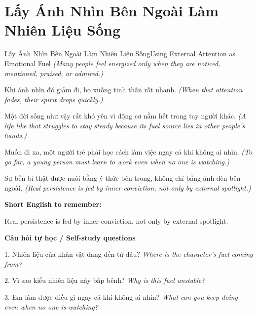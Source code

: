 \section{Lấy Ánh Nhìn Bên Ngoài Làm Nhiên Liệu Sống}
\begin{truyen}{Lấy Ánh Nhìn Bên Ngoài Làm Nhiên Liệu Sống}{Using External Attention as Emotional Fuel}
\textit{(Many people feel energized only when they are noticed, mentioned, praised, or admired.)}

Khi ánh nhìn đó giảm đi, họ xuống tinh thần rất nhanh.
\textit{(When that attention fades, their spirit drops quickly.)}

Một đời sống như vậy rất khó yên vì động cơ nằm hết trong tay người khác.
\textit{(A life like that struggles to stay steady because its fuel source lies in other people’s hands.)}

Muốn đi xa, một người trẻ phải học cách làm việc ngay cả khi không ai nhìn.
\textit{(To go far, a young person must learn to work even when no one is watching.)}

\end{truyen}

\begin{baihoc}
Sự bền bỉ thật được nuôi bằng ý thức bên trong, không chỉ bằng ánh đèn bên ngoài.
\textit{(Real persistence is fed by inner conviction, not only by external spotlight.)}
\end{baihoc}

\begin{ghinhoanh}
\textbf{Short English to remember:}

Real persistence is fed by inner conviction, not only by external spotlight.

\end{ghinhoanh}

\begin{tuhocnhanh}
\textbf{Câu hỏi tự học / Self-study questions}

1. Nhiên liệu của nhân vật đang đến từ đâu? \textit{Where is the character’s fuel coming from?}

2. Vì sao kiểu nhiên liệu này bấp bênh? \textit{Why is this fuel unstable?}

3. Em làm được điều gì ngay cả khi không ai nhìn? \textit{What can you keep doing even when no one is watching?}
\end{tuhocnhanh}
\ngancach

